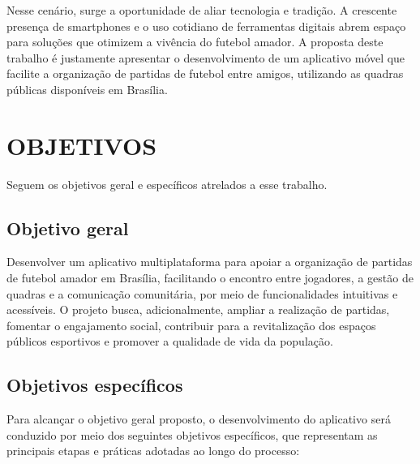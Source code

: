Nesse cenário, surge a oportunidade de aliar tecnologia e tradição. A crescente presença de smartphones e o uso cotidiano de ferramentas digitais abrem espaço para soluções que otimizem a vivência do futebol amador. A proposta deste trabalho é justamente apresentar o desenvolvimento de um aplicativo móvel que facilite a organização de partidas de futebol entre amigos, utilizando as quadras públicas disponíveis em Brasília.

\section{OBJETIVOS}

Seguem os objetivos geral e específicos atrelados a esse trabalho.

\subsection{Objetivo geral}

Desenvolver um aplicativo multiplataforma para apoiar a organização de partidas de futebol amador em Brasília, facilitando o encontro entre jogadores, a gestão de quadras e a comunicação comunitária, por meio de funcionalidades intuitivas e acessíveis. O projeto busca, adicionalmente, ampliar a realização de partidas, fomentar o engajamento social, contribuir para a revitalização dos espaços públicos esportivos e promover a qualidade de vida da população.

\subsection{Objetivos específicos}

Para alcançar o objetivo geral proposto, o desenvolvimento do aplicativo será conduzido por meio dos seguintes objetivos específicos, que representam as principais etapas e práticas adotadas ao longo do processo:


